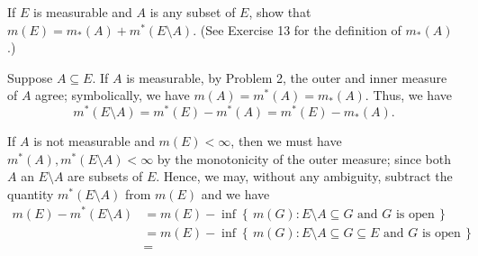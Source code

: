 \begin{problem}
  If \(E\) is measurable and \(A\) is any subset of \(E\), show that
  \(m(E)=m_*(A)+m^*(E\setminus A)\). (See Exercise 13 for the definition of
  \(m_*(A)\).)
\end{problem}
\begin{solution}
  Suppose \(A\subseteq E\). If \(A\) is measurable, by Problem 2, the outer
  and inner measure of \(A\) agree; symbolically, we have
  \(m(A)=m^*(A)=m_*(A)\). Thus, we have
  \[
    m^*(E\setminus A)=m^*(E)-m^*(A)=m^*(E)-m_*(A).
  \]

  If \(A\) is not measurable and \(m(E)<\infty\), then we must have
  \(m^*(A),m^*(E\setminus A)<\infty\) by the monotonicity of the outer
  measure; since both \(A\) an \(E\setminus A\) are subsets of
  \(E\). Hence, we may, without any ambiguity, subtract the quantity
  \(m^*(E\setminus A)\) from \(m(E)\) and we have
  \begin{align*}
    m(E)-m^*(E\setminus A)
    &=m(E)
      -\inf\left\{\,m(G):\text{\(E\setminus A\subseteq G\) and \(G\) is
      open}\,\right\}\\
    &=m(E)
      -\inf\left\{\,m(G):\text{\(E\setminus A\subseteq G\subseteq E\) and \(G\) is
      open}\,\right\}\\
    &=
  \end{align*}
\end{solution}

